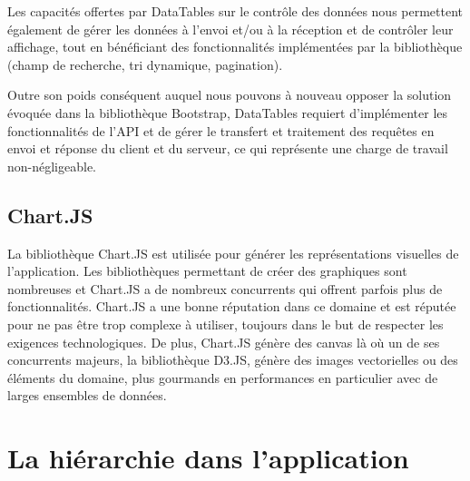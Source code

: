 \documentclass{EPL-master-thesis-covers-FR}
\begin{document}
				Les capacités offertes par DataTables sur le contrôle des données nous permettent également de gérer les données à l'envoi et/ou à la réception et de contrôler leur affichage, tout en bénéficiant des fonctionnalités implémentées par la bibliothèque (champ de recherche, tri dynamique, pagination).

				Outre son poids conséquent auquel nous pouvons à nouveau opposer la solution évoquée dans la bibliothèque Bootstrap, DataTables requiert d'implémenter les fonctionnalités de l'API et de gérer le transfert et traitement des requêtes en envoi et réponse du client et du serveur, ce qui représente une charge de travail non-négligeable.

			\subsection*{Chart.JS}

				La bibliothèque Chart.JS est utilisée pour générer les représentations visuelles de l'application. Les bibliothèques permettant de créer des graphiques sont nombreuses et Chart.JS a de nombreux concurrents qui offrent parfois plus de fonctionnalités. Chart.JS a une bonne réputation dans ce domaine et est réputée pour ne pas être trop complexe à utiliser, toujours dans le but de respecter les exigences technologiques.
				De plus, Chart.JS génère des canvas là où un de ses concurrents majeurs, la bibliothèque D3.JS, génère des images vectorielles ou des éléments du domaine, plus gourmands en performances en particulier avec de larges ensembles de données.

		\section{La hiérarchie dans l'application}
\end{document}

